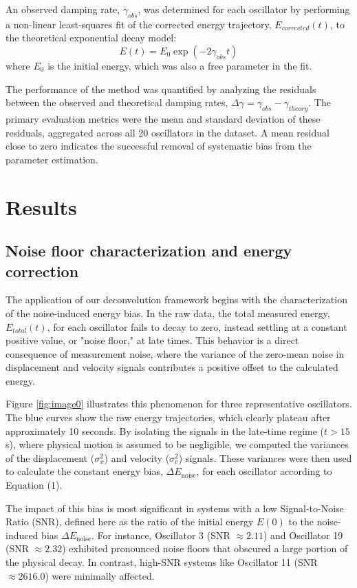 \documentclass[]{article}
\begin{document}
An observed damping rate, $\gamma_{obs}$, was determined for each oscillator by performing a non-linear least-squares fit of the corrected energy trajectory, $E_{corrected}(t)$, to the theoretical exponential decay model:
\begin{equation}
E(t) = E_0 \exp(-2\gamma_{obs} t)
\end{equation}
where $E_0$ is the initial energy, which was also a free parameter in the fit.

The performance of the method was quantified by analyzing the residuals between the observed and theoretical damping rates, $\Delta\gamma = \gamma_{obs} - \gamma_{theory}$. The primary evaluation metrics were the mean and standard deviation of these residuals, aggregated across all 20 oscillators in the dataset. A mean residual close to zero indicates the successful removal of systematic bias from the parameter estimation.

\section{Results}
\label{sec:results}
\subsection{Noise floor characterization and energy correction}

The application of our deconvolution framework begins with the characterization of the noise-induced energy bias. In the raw data, the total measured energy, $E_{total}(t)$, for each oscillator fails to decay to zero, instead settling at a constant positive value, or "noise floor," at late times. This behavior is a direct consequence of measurement noise, where the variance of the zero-mean noise in displacement and velocity signals contributes a positive offset to the calculated energy.

Figure \ref{fig:image0} illustrates this phenomenon for three representative oscillators. The blue curves show the raw energy trajectories, which clearly plateau after approximately 10 seconds. By isolating the signals in the late-time regime ($t > 15$ s), where physical motion is assumed to be negligible, we computed the variances of the displacement ($\sigma_x^2$) and velocity ($\sigma_v^2$) signals. These variances were then used to calculate the constant energy bias, $\Delta E_{\text{noise}}$, for each oscillator according to Equation (1).

The impact of this bias is most significant in systems with a low Signal-to-Noise Ratio (SNR), defined here as the ratio of the initial energy $E(0)$ to the noise-induced bias $\Delta E_{\text{noise}}$. For instance, Oscillator 3 (SNR $\approx 2.11$) and Oscillator 19 (SNR $\approx 2.32$) exhibited pronounced noise floors that obscured a large portion of the physical decay. In contrast, high-SNR systems like Oscillator 11 (SNR $\approx 2616.0$) were minimally affected.
\end{document}
